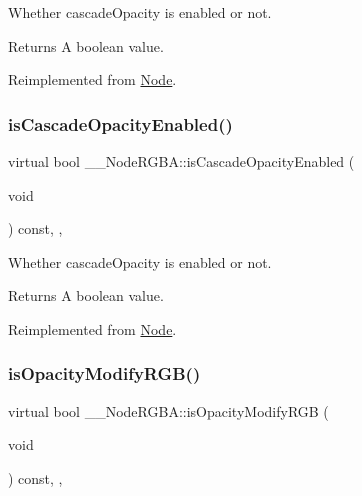 Whether cascade\+Opacity is enabled or not. \begin{DoxyReturn}{Returns}
A boolean value. 
\end{DoxyReturn}


Reimplemented from \hyperlink{classNode_a79f5da3b20b08356467db7ce95cf9f54}{Node}.

\mbox{\label{class____NodeRGBA_a421ef9c26c9860deb23184727d573415}} 
\subsubsection{\texorpdfstring{is\+Cascade\+Opacity\+Enabled()}{isCascadeOpacityEnabled()}\hspace{0.1cm}{\footnotesize\ttfamily [2/2]}}
{\footnotesize\ttfamily virtual bool \+\_\+\+\_\+\+Node\+R\+G\+B\+A\+::is\+Cascade\+Opacity\+Enabled (\begin{DoxyParamCaption}\item[{void}]{ }\end{DoxyParamCaption}) const\hspace{0.3cm}{\ttfamily [inline]}, {\ttfamily [override]}, {\ttfamily [virtual]}}

Whether cascade\+Opacity is enabled or not. \begin{DoxyReturn}{Returns}
A boolean value. 
\end{DoxyReturn}


Reimplemented from \hyperlink{classNode_a79f5da3b20b08356467db7ce95cf9f54}{Node}.

\mbox{\label{class____NodeRGBA_a60d28606b0a253ad511df43a868fa08c}} 
\subsubsection{\texorpdfstring{is\+Opacity\+Modify\+R\+G\+B()}{isOpacityModifyRGB()}\hspace{0.1cm}{\footnotesize\ttfamily [1/2]}}
{\footnotesize\ttfamily virtual bool \+\_\+\+\_\+\+Node\+R\+G\+B\+A\+::is\+Opacity\+Modify\+R\+GB (\begin{DoxyParamCaption}\item[{void}]{ }\end{DoxyParamCaption}) const\hspace{0.3cm}{\ttfamily [inline]}, {\ttfamily [override]}, {\ttfamily [virtual]}}

